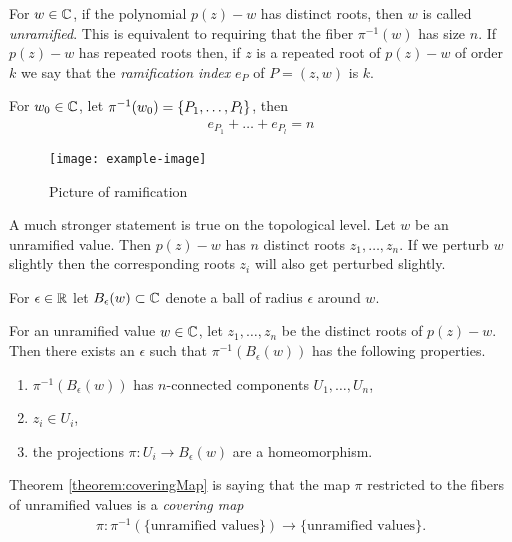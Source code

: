 \begin{definition}
  For $w \in \mathbb{C}$, if the polynomial $p(z) - w$ has distinct roots, then $w$ is called \emph{unramified}.
  This is equivalent to requiring that the fiber $\pi^{-1}(w)$ has size $n$.
  If $p(z) - w$ has repeated roots then, if $z$ is a repeated root of $p(z) - w$ of order $k$ we say that the \emph{ramification index} $e_P$ of $P = (z,w)$ is $k$.
\end{definition}
\begin{qbox}
  For $w_0 \in \mathbb{C}$, let $\pi^{-1}(w_0) = \left\{P_1, \dots, P_l\right\}$, then
  \begin{align*}
    e_{P_1} + \dots + e_{P_l} = n
  \end{align*}
\end{qbox}
\begin{figure}[H]
\centering
  \texttt{[image: example-image]}
  \caption{Picture of ramification}
  \label{figure:ramification}
\end{figure}

A much stronger statement is true on the topological level.
Let $w$ be an unramified value. Then $p(z) - w$ has $n$ distinct roots $z_1, \dots, z_n$. If we perturb $w$ slightly then the corresponding roots $z_i$ will also get perturbed slightly.

For $\epsilon \in \mathbb{R}$ let $B_\epsilon(w) \subset \mathbb{C}$ denote a ball of radius $\epsilon$ around $w$.
\begin{theorem}
  \label{theorem:coveringMap}
  For an unramified value $w \in \mathbb{C}$, let $z_1, \dots, z_n$ be the distinct roots of $p(z) - w$.
  Then there exists an $\epsilon$ such that $\pi^{-1}(B_\epsilon(w))$ has the following properties.
  \begin{enumerate}
    \item $\pi^{-1}(B_\epsilon(w))$ has $n$-connected components $U_1, \dots, U_n$,
    \item $z_i \in U_i$,
    \item the projections $\pi: U_i \rightarrow B_\epsilon(w)$ are a homeomorphism.
  \end{enumerate}
\end{theorem}

Theorem \ref{theorem:coveringMap} is saying that the map $\pi$ restricted to the fibers of unramified values is a \emph{covering map}
\begin{align*}
  \pi: \pi^{-1}(\mbox{\{unramified values\}}) \longrightarrow \mbox{\{unramified values\}}.
\end{align*}

